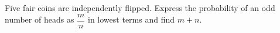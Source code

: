 Five fair coins are independently flipped. Express the probability of an odd number of heads as $\dfrac{m}{n}$ in lowest terms and find $m+n$.
